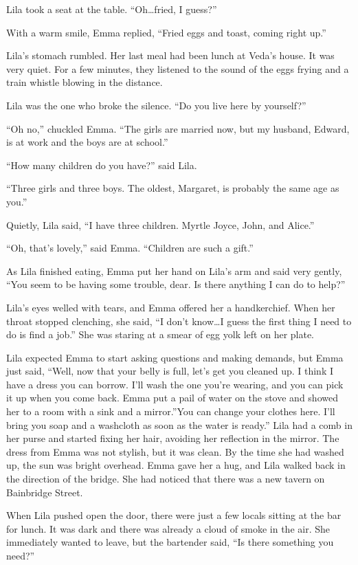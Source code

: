 \documentclass[
  american,
  letterpaper,
]{book}
\begin{document}
Lila took a seat at the table. ``Oh\ldots fried, I guess?''

With a warm smile, Emma replied, ``Fried eggs and toast, coming right
up.''

Lila's stomach rumbled. Her last meal had been lunch at Veda's house. It
was very quiet. For a few minutes, they listened to the sound of the
eggs frying and a train whistle blowing in the distance.

Lila was the one who broke the silence. ``Do you live here by
yourself?''

``Oh no,'' chuckled Emma. ``The girls are married now, but my husband,
Edward, is at work and the boys are at school.''

``How many children do you have?'' said Lila.

``Three girls and three boys. The oldest, Margaret, is probably the same
age as you.''

Quietly, Lila said, ``I have three children. Myrtle Joyce, John, and
Alice.''

``Oh, that's lovely,'' said Emma. ``Children are such a gift.''

As Lila finished eating, Emma put her hand on Lila's arm and said very
gently, ``You seem to be having some trouble, dear. Is there anything I
can do to help?''

Lila's eyes welled with tears, and Emma offered her a handkerchief. When
her throat stopped clenching, she said, ``I don't know\ldots I guess the
first thing I need to do is find a job.'' She was staring at a smear of
egg yolk left on her plate.

Lila expected Emma to start asking questions and making demands, but
Emma just said, ``Well, now that your belly is full, let's get you
cleaned up. I think I have a dress you can borrow. I'll wash the one
you're wearing, and you can pick it up when you come back. Emma put a
pail of water on the stove and showed her to a room with a sink and a
mirror.''You can change your clothes here. I'll bring you soap and a
washcloth as soon as the water is ready.'' Lila had a comb in her purse
and started fixing her hair, avoiding her reflection in the mirror. The
dress from Emma was not stylish, but it was clean. By the time she had
washed up, the sun was bright overhead. Emma gave her a hug, and Lila
walked back in the direction of the bridge. She had noticed that there
was a new tavern on Bainbridge Street.

When Lila pushed open the door, there were just a few locals sitting at
the bar for lunch. It was dark and there was already a cloud of smoke in
the air. She immediately wanted to leave, but the bartender said, ``Is
there something you need?''
\end{document}
